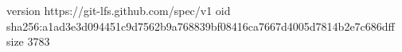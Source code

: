 version https://git-lfs.github.com/spec/v1
oid sha256:a1ad3e3d094451c9d7562b9a768839bf08416ca7667d4005d7814b2e7c686dff
size 3783
